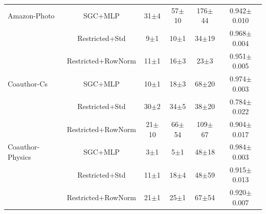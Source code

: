 \begin{table}[t]
\begin{tabular}{lccccc}
\midrule
Amazon-Photo         & SGC+MLP                   & 31$\pm$4 & 57$\pm$10 & 176$\pm$44 & 0.942$\pm$0.010 \\
                     & Restricted+Std            & 9$\pm$1 & 10$\pm$1 & 34$\pm$19 & 0.968$\pm$0.004 \\
                     & Restricted+RowNorm        & 11$\pm$1 & 16$\pm$3 & 23$\pm$3 & 0.951$\pm$0.005 \\
\midrule
Coauthor-Cs          & SGC+MLP                   & 10$\pm$1 & 18$\pm$3 & 68$\pm$20 & 0.974$\pm$0.003 \\
                     & Restricted+Std            & 30$\pm$2 & 34$\pm$5 & 38$\pm$20 & 0.784$\pm$0.022 \\
                     & Restricted+RowNorm        & 21$\pm$10 & 66$\pm$54 & 109$\pm$67 & 0.904$\pm$0.017 \\
\midrule
Coauthor-Physics     & SGC+MLP                   & 3$\pm$1 & 5$\pm$1 & 48$\pm$18 & 0.984$\pm$0.003 \\
                     & Restricted+Std            & 11$\pm$1 & 18$\pm$4 & 48$\pm$59 & 0.915$\pm$0.013 \\
                     & Restricted+RowNorm        & 21$\pm$1 & 25$\pm$1 & 67$\pm$54 & 0.920$\pm$0.007 \\
\bottomrule
\end{tabular}
\end{table}
